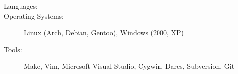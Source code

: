 \documentclass[letterpaper,10pt]{article}
\begin{document}
\begin{itemize}
\begin{itemize}
    \end{itemize}
\end{itemize}
\begin{description}
\item[Languages:]
\begin{minipage}[t]{6.5in}
\end{minipage}
\item[Operating Systems:] Linux (Arch, Debian, Gentoo), Windows (2000, XP)
\item[Tools:] Make, Vim, Microsoft Visual Studio, Cygwin, Darcs, Subversion, Git
\end{description}
\end{document}
